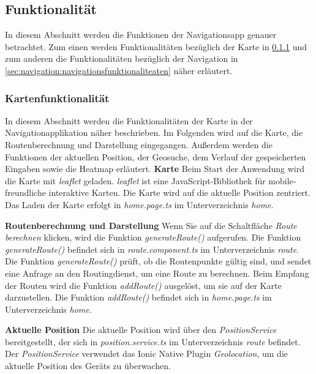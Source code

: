 \subsection{Funktionalität}
In diesem Abschnitt werden die Funktionen der Navigationsapp genauer betrachtet. Zum einen werden Funktionalitäten bezüglich der Karte in \ref{sec:navigation:kartenfunktionalitaet} und zum anderen die Funktionalitäten bezüglich der Navigation in \ref{sec:navigation:navigationsfunktionaliteaten} näher erläutert. 
\subsubsection{Kartenfunktionalität}
\label{sec:navigation:kartenfunktionalitaet}
In diesem Abschnitt werden die Funktionalitäten der Karte in der Navigationapplikation näher beschrieben. Im Folgenden wird auf die Karte, die Routenberechnung und Darstellung eingegangen. Außerdem werden die Funktionen der aktuellen Position, der Geosuche, dem Verlauf der gespeicherten Eingaben sowie die Heatmap erläutert. \newline
\textbf{Karte} \newline
Beim Start der Anwendung wird die Karte mit \textit{leaflet} geladen. 
\textit{leaflet} ist eine JavaScript-Bibliothek für mobile-freundliche interaktive Karten. 
Die Karte wird auf die aktuelle Position zentriert. 
Das Laden der Karte erfolgt in \textit{home.page.ts} im Unterverzeichnis \textit{home}.

\textbf{Routenberechnung und Darstellung} \newline
Wenn Sie auf die Schaltfläche \textit{Route berechnen} klicken, wird die Funktion \textit{generateRoute()} aufgerufen. 
Die Funktion \textit{generateRoute()} befindet sich in \textit{route.component.ts} im Unterverzeichnis \textit{route}. 
Die Funktion \textit{generateRoute()} prüft, ob die Routenpunkte gültig sind, und sendet eine Anfrage an den Routingdienst, um eine Route zu berechnen. 
Beim Empfang der Routen wird die Funktion \textit{addRoute()} ausgelöst, um sie auf der Karte darzustellen. 
Die Funktion \textit{addRoute()} befindet sich in \textit{home.page.ts} im Unterverzeichnis \textit{home}.

\textbf{Aktuelle Position}\newline
Die aktuelle Position wird über den \textit{PositionService} bereitgestellt, der sich in \textit{position.service.ts} im Unterverzeichnis \textit{route} befindet. 
Der \textit{PositionService} verwendet das Ionic Native Plugin \textit{Geolocation}, um die aktuelle Position des Geräts zu überwachen.

